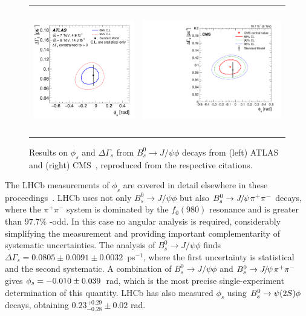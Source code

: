 \begin{figure}
  \begin{center}
    \begin{tabular}{c c}
      \includegraphics[height=5.5cm]{figs/atlas_phis_result.pdf} &
      \includegraphics[height=5.5cm]{figs/cms_phis_result.pdf} 
    \end{tabular}
  \end{center}
  \vspace{-0.5cm}
  \caption{\label{phis_atlas_cms}Results on $\phi_s$ and $\Delta\Gamma_s$ from
  $B^0_s \to J/\psi \phi$ decays from (left) ATLAS~\cite{atlas_phis_8TeV} and (right) CMS~\cite{cms_phis}, reproduced from the respective citations.}
\end{figure}

The LHCb measurements of $\phi_s$ are covered in detail elsewhere in these proceedings~\cite{LHCBPHISPROC}.
LHCb uses not only $B^0_s \to J/\psi \phi$ but also ${{B}^0_{s}}\rightarrow {\ensuremath{{J\mskip -3mu/\mskip -2mu\psi\mskip 2mu}}}\pi^+\pi^-$ decays,
where the $\pi^+\pi^-$ system is dominated by the $f_0(980)$ resonance and is greater than $97.7\%$ \CP-odd.
In this case no angular analysis is required, considerably simplifying the measurement
and providing important complementarity of systematic uncertainties.
The analysis of $B^0_s \to J/\psi \phi$ finds $\Delta\Gamma_s = 0.0805  \pm 0.0091         \pm  0.0032$~ps$^{-1}$,
where the first uncertainty is statistical and the second systematic. 
A combination of $B^0_s \to J/\psi \phi$ and ${{B}^0_{s}}\rightarrow {\ensuremath{{J\mskip -3mu/\mskip -2mu\psi\mskip 2mu}}}\pi^+\pi^-$ gives ${\phi_{{s}}} = -0.010  \pm  0.039$~rad, which is the most 
precise single-experiment determination of this quantity.
LHCb has also measured $\phi_s$ using ${{B}^0_{s}}\rightarrow \psi(2S)\phi$ decays, obtaining
$0.23^{+0.29}_{-0.28} \pm 0.02$ rad.

